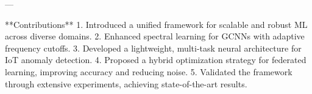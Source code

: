---

**Contributions**  
1. Introduced a unified framework for scalable and robust ML across diverse domains.  
2. Enhanced spectral learning for GCNNs with adaptive frequency cutoffs.  
3. Developed a lightweight, multi-task neural architecture for IoT anomaly detection.  
4. Proposed a hybrid optimization strategy for federated learning, improving accuracy and reducing noise.  
5. Validated the framework through extensive experiments, achieving state-of-the-art results.  